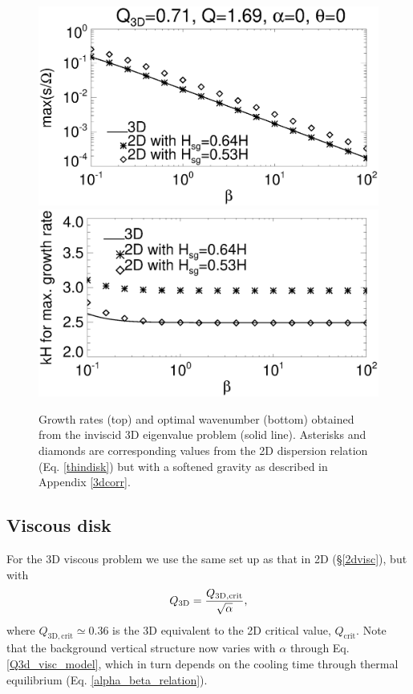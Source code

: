 \begin{figure}
  \includegraphics[width=\linewidth,clip=true,trim=0cm 2cm 0.cm
    0.0cm]{figures/3d_inviscid_rates}\\
  \includegraphics[width=\linewidth,clip=true,trim=0cm 0cm 0.cm
    0.8cm]{figures/3d_inviscid_kmax}
  \caption{Growth rates (top) and optimal wavenumber (bottom) obtained
    from the inviscid 3D eigenvalue problem (solid line). Asterisks
    and diamonds are corresponding values from the 2D dispersion
    relation (Eq. \ref{thindisk}) but with a softened gravity as
    described in Appendix \ref{3dcorr}. \label{3d_inviscid}} 
\end{figure}

\subsection{Viscous disk} %
For the 3D viscous problem we use the same set up as that in 2D
(\S\ref{2dvisc}), but with 
\begin{align}
  Q_\mathrm{3D} = \frac{Q_\mathrm{3D,crit}}{\sqrt{\alpha}}, \label{Q3d_visc_model}
\end{align}
where $Q_\mathrm{3D,crit}\simeq0.36$ is the 3D equivalent to the 2D
critical value, $Q_\mathrm{crit}$. Note that the background vertical
structure now varies with $\alpha$ through Eq. \ref{Q3d_visc_model},
which in turn depends on the cooling time through thermal
equilibrium (Eq. \ref{alpha_beta_relation}). 

